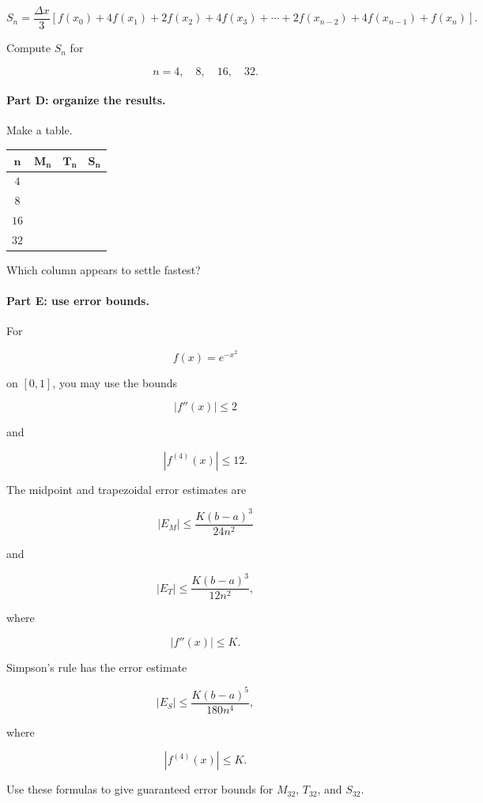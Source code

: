 \[
\boxed{
S_n
=
\frac{\Delta x}{3}
\left[
f(x_0)
+
4f(x_1)
+
2f(x_2)
+
4f(x_3)
+\cdots+
2f(x_{n-2})
+
4f(x_{n-1})
+
f(x_n)
\right].
}
\]

Compute \(S_n\) for

\[
n=4,\quad 8,\quad 16,\quad 32.
\]

\paragraph{Part D: organize the results.}
Make a table.

\begin{center}
\renewcommand{\arraystretch}{1.35}
\begin{tabular}{c|c|c|c}
\(\boldsymbol{n}\) & \(\boldsymbol{M_n}\) & \(\boldsymbol{T_n}\) & \(\boldsymbol{S_n}\) \\ \hline
\(4\) & & & \\
\(8\) & & & \\
\(16\) & & & \\
\(32\) & & &
\end{tabular}
\end{center}

Which column appears to settle fastest?

\paragraph{Part E: use error bounds.}
For

\[
f(x)=e^{-x^2}
\]

on \([0,1]\), you may use the bounds

\[
|f''(x)|\le 2
\]

and

\[
|f^{(4)}(x)|\le 12.
\]

The midpoint and trapezoidal error estimates are

\[
\boxed{
|E_M|
\le
\frac{K(b-a)^3}{24n^2}
}
\]

and

\[
\boxed{
|E_T|
\le
\frac{K(b-a)^3}{12n^2},
}
\]

where

\[
|f''(x)|\le K.
\]

Simpson's rule has the error estimate

\[
\boxed{
|E_S|
\le
\frac{K(b-a)^5}{180n^4},
}
\]

where

\[
|f^{(4)}(x)|\le K.
\]

Use these formulas to give guaranteed error bounds for \(M_{32}\), \(T_{32}\), and
\(S_{32}\).

